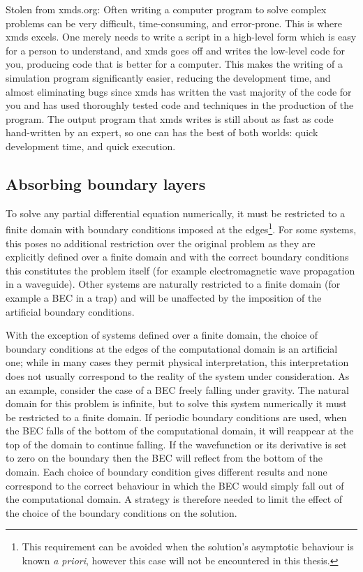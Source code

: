Stolen from xmds.org: Often writing a computer program to solve complex problems can be very difficult, time-consuming, and error-prone. This is where xmds excels. One merely needs to write a script in a high-level form which is easy for a person to understand, and xmds goes off and writes the low-level code for you, producing code that is better for a computer. This makes the writing of a simulation program significantly easier, reducing the development time, and almost eliminating bugs since xmds has written the vast majority of the code for you and has used thoroughly tested code and techniques in the production of the program. The output program that xmds writes is still about as fast as code hand-written by an expert, so one can has the best of both worlds: quick development time, and quick execution.

\subsection{Absorbing boundary layers}
\label{BackgroundTheory:AbsorbingBoundaryLayers}

To solve any partial differential equation numerically, it must be restricted to a finite domain with boundary conditions imposed at the edges\footnote{This requirement can be avoided when the solution's asymptotic behaviour is known \emph{a priori}, however this case will not be encountered in this thesis.}. For some systems, this poses no additional restriction over the original problem as they are explicitly defined over a finite domain and with the correct boundary conditions this constitutes the problem itself (for example electromagnetic wave propagation in a waveguide). Other systems are naturally restricted to a finite domain (for example a BEC in a trap) and will be unaffected by the imposition of the artificial boundary conditions. 

With the exception of systems defined over a finite domain, the choice of boundary conditions at the edges of the computational domain is an artificial one; while in many cases they permit physical interpretation, this interpretation does not usually correspond to the reality of the system under consideration. As an example, consider the case of a BEC freely falling under gravity. The natural domain for this problem is infinite, but to solve this system numerically it must be restricted to a finite domain. If periodic boundary conditions are used, when the BEC falls of the bottom of the computational domain, it will reappear at the top of the domain to continue falling. If the wavefunction or its derivative is set to zero on the boundary then the BEC will reflect from the bottom of the domain. Each choice of boundary condition gives different results and none correspond to the correct behaviour in which the BEC would simply fall out of the computational domain. A strategy is therefore needed to limit the effect of the choice of the boundary conditions on the solution.


